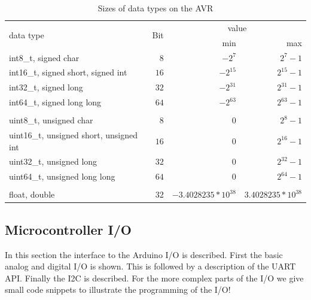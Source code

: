 \begin{table}
{\large
\begin{center}
\begin{tabular}{|l|r|r|r|}
\hline
\multirow{2}{*}{data type} & \multirow{2}{*}{Bit} & \multicolumn{2}{|c|}{value}  \\
\cline{3-4}
& & min & max \\
\hline
int8\_t, signed char				& $8$	& $-2^{7}$		& $2^{7}-1$	\\
int16\_t, signed short, signed int		& $16$	& $-2^{15}$		& $2^{15}-1$	\\
int32\_t, signed long				& $32$ 	& $-2^{31}$		& $2^{31}-1$	\\
int64\_t, signed long long			& $64$ 	& $-2^{63}$		& $2^{63}-1$	\\
& & & \\
uint8\_t, unsigned char			& $8$	& $0$			& $2^{8}-1$	\\
uint16\_t, unsigned short, unsigned int	& $16$ 	& $0$ 			& $2^{16}-1$	\\
uint32\_t, unsigned long			& $32$ 	& $0$			& $2^{32}-1$	\\
uint64\_t, unsigned long long		& $64$ 	& $0$			& $2^{64}-1$	\\
& & & \\
float, double					& $32$ 	& $-3.4028235*10^{38}$	& $3.4028235*10^{38}$	\\
\hline
\end{tabular}
\end{center}
}
\caption{Sizes of data types on the AVR}
\label{tab:datatypes}
\end{table}


\subsection{Microcontroller I/O} \label{sec:microcontrollerIO}
In this section the interface to the Arduino I/O is described.
First the basic analog and digital I/O is shown.
This is followed by a description of the UART API. 
Finally the I2C is described.
For the more complex parts of the I/O we give small code snippets to illustrate the programming of the I/O!


